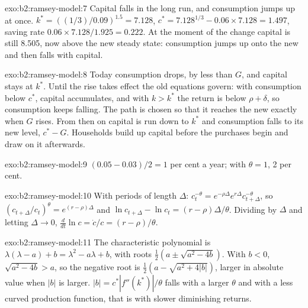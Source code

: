 \begin{solution}{exo:b2:ramsey-model:7}
Capital falls in the long run, and consumption jumps up at once. $k^* = ((1/3)/0.09)^{1.5} = 7.128$, $c^* = 7.128^{1/3} - 0.06 \times 7.128 = 1.497$, saving rate $0.06 \times 7.128/1.925 = 0.222$. At the moment of the change
capital is still 8.505, now above the new steady state: consumption jumps up onto the new  and then falls with
capital.
\end{solution}

\begin{solution}{exo:b2:ramsey-model:8}
Today consumption drops, by less than $G$, and capital stays at $k^*$. Until the rise takes effect the old equations govern: with
consumption below $c^*$, capital accumulates, and with $k > k^*$ the return is below $\rho + \delta$, so consumption keeps falling. The path is chosen so that it
reaches the new  exactly when $G$ rises. From then on capital is run down to $k^*$ and consumption falls to its new
level, $c^* - G$. Households build up capital before the purchases begin and draw on it afterwards.
\end{solution}

\begin{solution}{exo:b2:ramsey-model:9}
$(0.05 - 0.03)/2 = 1$ per cent a year; with $\theta = 1$, 2 per cent.
\end{solution}

\begin{solution}{exo:b2:ramsey-model:10}
With periods of length $\Delta$: $c_t^{-\theta} = e^{-\rho\Delta}e^{r\Delta}c_{t+\Delta}^{-\theta}$, so $(c_{t+\Delta}/c_t)^\theta = e^{(r - \rho)\Delta}$ and $\ln c_{t+\Delta} - \ln c_t = (r - \rho)\Delta/\theta$. Dividing by $\Delta$ and letting $\Delta \to 0$, $\frac{d}{dt}\ln c = \dot c/c = (r - \rho)/\theta$.
\end{solution}

\begin{solution}{exo:b2:ramsey-model:11}
The characteristic polynomial is $\lambda(\lambda - a) + b = \lambda^2 - a\lambda + b$, with roots $\tfrac12(a \pm \sqrt{a^2 - 4b})$. With $b < 0$, $\sqrt{a^2 - 4b} > a$, so the negative root is $\tfrac12(a - \sqrt{a^2 + 4|b|})$, larger in absolute value
when $|b|$ is larger. $|b| = c^*|f''(k^*)|/\theta$ falls with a larger $\theta$ and with a less curved production function, that is with slower diminishing returns.
\end{solution}

